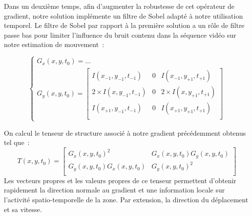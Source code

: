 \documentclass[fleqn,10pt]{SelfArx} %
\begin{document}
Dans un deuxième temps, afin d'augmenter la robustesse de cet opérateur de gradient,
notre solution implémente un filtre de Sobel adapté à notre utilisation temporel.
Le filtre de Sobel par rapport à la première solution a un rôle de filtre passe bas pour limiter 
l'influence du bruit contenu dans la séquence vidéo sur notre estimation de mouvement~:

\[
    \begin{cases}
        G_{x}(x,y,t_{0}) = \ldots \\
        G_{y}(x,y,t_{0}) = 
        \begin{bmatrix}
            I(x_{-1}, y_{-1}, t_{-1}) & 0 & I(x_{-1}, y_{+1}, t_{+1}) \\
            2 \times I(x,      y_{-1}, t_{-1}) & 0 & 2 \times I(x,      y_{+1}, t_{+1}) \\
            I(x_{+1}, y_{-1}, t_{-1}) & 0 & I(x_{+1}, y_{+1}, t_{+1}) \\
        \end{bmatrix}
    \end{cases}
\]

On calcul le tenseur de structure associé à notre gradient précédemment obtenus tel que~:
\[
    T(x, y, t_{0}) = 
    \begin{bmatrix}
        G_{x}(x,y,t_{0})^{2} & G_{x}(x,y,t_{0})G_{y}(x,y,t_{0}) \\
        G_{y}(x,y,t_{0})G_{x}(x,y,t_{0}) & G_{y}(x,y,t_{0})^{2} \\
    \end{bmatrix}
\]
Les vecteurs propres et les valeurs propres de ce tenseur permettent d'obtenir rapidement la direction normale
au gradient et une information locale sur l'activité spatio-temporelle de la zone. Par extension, la direction du déplacement et sa vitesse.
\end{document}

